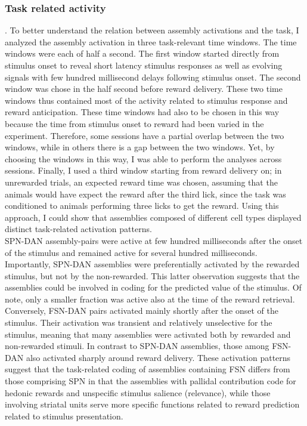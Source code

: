 \subsubsection{Task related activity}  
.  To better understand the relation between assembly activations and the task, I analyzed the assembly activation in three task-relevant time windows. The time windows were each of half a second. The first window started directly from stimulus onset to reveal short latency stimulus responses as well as evolving signals with few hundred millisecond delays following stimulus onset. The second window was chose in the half second before reward delivery. These two time windows thus contained most of the activity related to stimulus response and reward anticipation. These time windows had also to be chosen in this way because the time from stimulus onset to reward had been varied in the experiment. Therefore, some sessions have a partial overlap between the two windows, while in others there is a gap between the two windows.  Yet, by choosing the windows in this way, I was able to perform the analyses across sessions. Finally, I used a third window starting from reward delivery on; in unrewarded trials, an expected reward time was chosen, assuming that the animals would have expect the reward after the third lick, since the task was conditioned to animals performing three licks to get the reward. Using this approach, I could show that assemblies composed of different cell types displayed distinct task-related activation patterns.\\
SPN-DAN assembly-pairs were active at few hundred milliseconds after the onset of the stimulus and remained active for several hundred milliseconds. Importantly, SPN-DAN assemblies were preferentially activated by the rewarded stimulus, but not by the non-rewarded. This latter observation suggests that the assemblies could be involved in coding for the predicted value of the stimulus. Of note, only a smaller fraction was active also at the time of the reward retrieval.\\
Conversely, FSN-DAN pairs activated mainly shortly after the onset of the stimulus. Their activation was transient and relatively unselective for the stimulus, meaning that many assemblies were activated both by rewarded and non-rewarded stimuli. In contrast to SPN-DAN assemblies, those among FSN-DAN also activated sharply around reward delivery. These activation patterns suggest that the task-related coding of assemblies containing FSN differs from those comprising SPN in that the assemblies with pallidal contribution code for hedonic rewards and unspecific stimulus salience (relevance), while those involving striatal units serve more specific functions related to reward prediction related to stimulus presentation.\\\\
